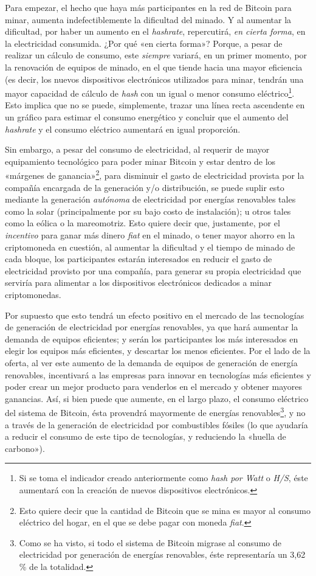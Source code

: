 \documentclass[12pt,a4paper,twoside]{book}
\begin{document}
Para empezar, el hecho que haya más participantes en la red de Bitcoin para minar, aumenta indefectiblemente la dificultad del minado. Y al aumentar la dificultad, por haber un aumento en el \textit{hashrate}, repercutirá, \textit{en cierta forma}, en la electricidad consumida. ¿Por qué «en cierta forma»? Porque, a pesar de realizar un cálculo de consumo, este \textit{siempre} variará, en un primer momento, por la renovación de equipos de minado, en el que tiende hacia una mayor eficiencia (es decir, los nuevos dispositivos electrónicos utilizados para minar, tendrán una mayor capacidad de cálculo de \textit{hash} con un igual o menor consumo eléctrico\footnote{Si se toma el indicador creado anteriormente como \textit{hash por Watt} o \textit{H/S}, éste aumentará con la creación de nuevos dispositivos electrónicos.}. Esto implica que no se puede, simplemente, trazar una línea recta ascendente en un gráfico para estimar el consumo energético y concluir que el aumento del \textit{hashrate} y el consumo eléctrico aumentará en igual proporción.

Sin embargo, a pesar del consumo de electricidad, al requerir de mayor equipamiento tecnológico para poder minar Bitcoin y estar dentro de los «márgenes de ganancia»\footnote{Esto quiere decir que la cantidad de Bitcoin que se mina es mayor al consumo eléctrico del hogar, en el que se debe pagar con moneda \textit{fiat}.}, para disminuir el gasto de electricidad provista por la compañía encargada de la generación y/o distribución, se puede suplir esto mediante la generación \textit{autónoma} de electricidad por energías renovables tales como la solar (principalmente por su bajo costo de instalación); u otros tales como la eólica o la mareomotriz. Esto quiere decir que, justamente, por el \textit{incentivo} para ganar más dinero \textit{fiat} en el minado, o tener mayor ahorro en la criptomoneda en cuestión, al aumentar la dificultad y el tiempo de minado de cada bloque, los participantes estarán interesados en reducir el gasto de electricidad provisto por una compañía, para generar su propia electricidad que serviría para alimentar a los dispositivos electrónicos dedicados a minar criptomonedas.

Por supuesto que esto tendrá un efecto positivo en el mercado de las tecnologías de generación de electricidad por energías renovables, ya que hará aumentar la demanda de equipos eficientes; y serán los participantes los más interesados en elegir los equipos más eficientes, y descartar los menos eficientes. Por el lado de la oferta, al ver este aumento de la demanda de equipos de generación de energía renovables, incentivará a las empresas para innovar en tecnologías más eficientes y poder crear un mejor producto para venderlos en el mercado y obtener mayores ganancias. Así, si bien puede que aumente, en el largo plazo, el consumo eléctrico del sistema de Bitcoin, ésta provendrá mayormente de energías renovables\footnote{Como se ha visto, si todo el sistema de Bitcoin migrase al consumo de electricidad por generación de energías renovables, éste representaría un 3,62 \% de la totalidad.}, y no a través de la generación de electricidad por combustibles fósiles (lo que ayudaría a reducir el consumo de este tipo de tecnologías, y reduciendo la «huella de carbono»).
\end{document}
